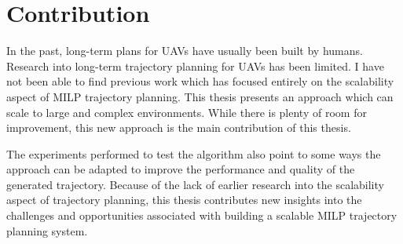 \section{Contribution}
In the past, long-term plans for UAVs have usually been built by humans. Research into long-term trajectory planning for UAVs has been limited. I have not been able to find previous work which has focused entirely on the scalability aspect of MILP trajectory planning. This thesis presents an approach which can scale to large and complex environments. While there is plenty of room for improvement, this new approach is the main contribution of this thesis.
\par
The experiments performed to test the algorithm also point to some ways the approach can be adapted to improve the performance and quality of the generated trajectory. Because of the lack of earlier research into the scalability aspect of trajectory planning, this thesis contributes new insights into the challenges and opportunities associated with building a scalable MILP trajectory planning system.

